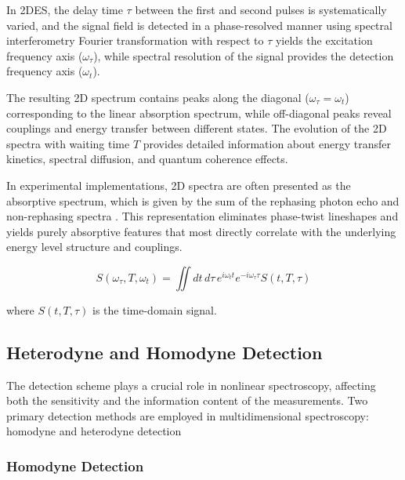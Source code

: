 \noindent In 2DES, the delay time $\tau$ between the first and second pulses is systematically varied, and the signal field is detected in a phase-resolved manner using spectral interferometry %
Fourier transformation with respect to $\tau$ yields the excitation frequency axis ($\omega_\tau$), while spectral resolution of the signal provides the detection frequency axis ($\omega_t$).

\noindent The resulting 2D spectrum contains peaks along the diagonal ($\omega_\tau = \omega_t$) corresponding to the linear absorption spectrum, while off-diagonal peaks reveal couplings and energy transfer between different states. The evolution of the 2D spectra with waiting time $T$ provides detailed information about energy transfer kinetics, spectral diffusion, and quantum coherence effects.

\noindent In experimental implementations, 2D spectra are often presented as the absorptive spectrum, which is given by the sum of the rephasing photon echo and non-rephasing spectra \cite{Cho2009TwodimensionalOpticalSpectroscopy}. This representation eliminates phase-twist lineshapes and yields purely absorptive features that most directly correlate with the underlying energy level structure and couplings.

\begin{equation}
    S(\omega_\tau, T, \omega_t) = \iint dt\, d\tau\, e^{i\omega_t t} e^{-i\omega_\tau \tau} S(t, T, \tau)
    \label{eq:2des_signal}
\end{equation}

\noindent where $S(t, T, \tau)$ is the time-domain signal.

\subsection{Heterodyne and Homodyne Detection}
\label{subsec:heterodyne_homodyne}

\noindent The detection scheme plays a crucial role in nonlinear spectroscopy, affecting both the sensitivity and the information content of the measurements. Two primary detection methods are employed in multidimensional spectroscopy: homodyne and heterodyne detection %

\subsubsection{Homodyne Detection}
\label{subsubsec:homodyne}

